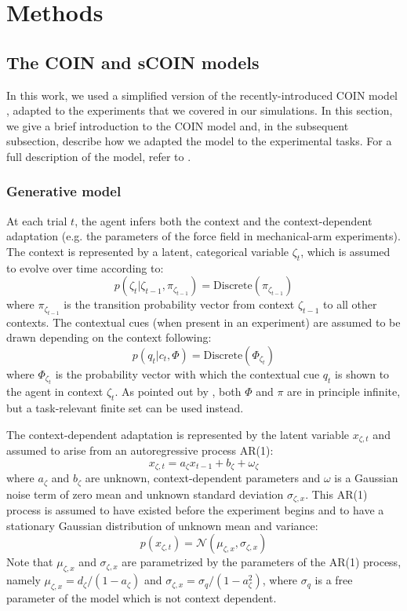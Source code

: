 \documentclass[a4paper,doc,floatsintext,natbib]{apa6}
\begin{document}
\section{Methods}
\subsection{The COIN and sCOIN models}
In this work, we used a simplified version of the recently-introduced COIN model \citep{Heald_Contextual_2021}, adapted to the experiments that we covered in our simulations. In this section, we give a brief introduction to the COIN model and, in the subsequent subsection, describe how we adapted the model to the experimental tasks. For a full description of the model, refer to \cite{Heald_Contextual_2021}.

\subsubsection{Generative model}
At each trial $t$, the agent infers both the context and the context-dependent adaptation (e.g. the parameters of the force field in mechanical-arm experiments). The context is represented by a latent, categorical variable $\zeta_t$, which is assumed to evolve over time according to:
\begin{equation}
p(\zeta_t | \zeta_{t-1}, \pi_{\zeta_{t-1}}) = \text{Discrete}\left(\pi_{\zeta_{t-1}}\right)
\end{equation}
where $\pi_{\zeta_{t-1}}$ is the transition probability vector from context $\zeta_{t-1}$ to all other contexts. The contextual cues (when present in an experiment) are assumed to be drawn depending on the context following:
\begin{equation}
p(q_t | c_t, \Phi) = \text{Discrete}(\Phi_{\zeta_t})
\end{equation}
where $\Phi_{\zeta_t}$ is the probability vector with which the contextual cue $q_t$ is shown to the agent in context $\zeta_t$. As pointed out by \cite{Heald_Contextual_2021}, both $\Phi$ and $\pi$ are in principle infinite, but a task-relevant finite set can be used instead.

The context-dependent adaptation is represented by the latent variable $x_{\zeta,t}$ and assumed to arise from an autoregressive process AR(1):
\begin{equation}
x_{\zeta,t} = a_\zeta x_{t-1} + b_\zeta + \omega_\zeta
\end{equation}
where $a_\zeta$ and $b_\zeta$ are unknown, context-dependent parameters and $\omega$ is a Gaussian noise term of zero mean and unknown standard deviation $\sigma_{\zeta, x}$. This AR(1) process is assumed to have existed before the experiment begins and to have a stationary Gaussian distribution of unknown mean and variance:
\begin{equation}
p(x_{\zeta,t}) = \mathcal{N}(\mu_{\zeta,x}, \sigma_{\zeta, x})
\end{equation}
Note that $\mu_{\zeta, x}$ and $\sigma_{\zeta,x}$ are parametrized by the parameters of the AR(1) process, namely $\mu_{\zeta,x} = d_\zeta / (1 - a_\zeta)$ and $\sigma_{\zeta, x} = \sigma_q / (1 - a_\zeta^2)$, where $\sigma_q$ is a free parameter of the model which is not context dependent.
\end{document}
